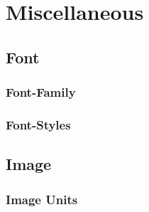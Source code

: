 \documentclass{article}
\newcommand{\myblock}{} %
\begin{document}


\section{Miscellaneous}
\subsection{Font}

    \subsubsection{Font-Family}
    
    \label{secc:font-family-sheet}

    \subsubsection{Font-Styles}
    
    \label{secc:font-style-sheet}
\subsection{Image}
\myblock{
    \subsubsection{Image Units}
    
    \label{secc:Image-Units}
}
    
\end{document}
